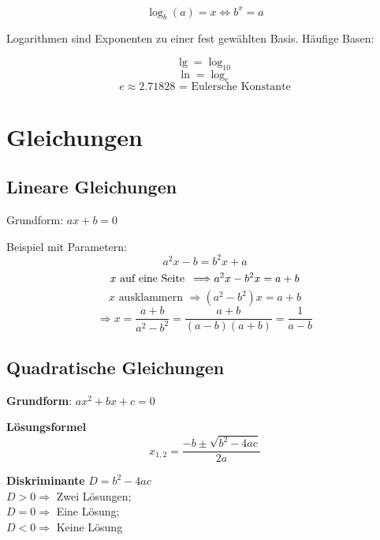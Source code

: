 \begin{multicols}{2}
\begin{tcolorbox}[colback=white]
$$\log_b{}(a)=x \Longleftrightarrow{} b^x = a$$
\end{tcolorbox}

Logarithmen sind Exponenten zu einer fest gewählten Basis. Häufige Basen:

$$\lg = \log_{10} $$
$$\ln = \log_e$$
$$e \approx 2.71828 \textrm{ = Eulersche Konstante}$$


\begin{tcolorbox}[colback=white]

\end{tcolorbox}%
%
\RLP{\forceCB{}}%
\keinHeaderUndKeinFooter{}

\section*{Gleichungen}

\subsection*{Lineare Gleichungen}
Grundform: $ax+b=0$

Beispiel mit Parametern:
$$a^2x-b=b^2x+a$$
$$x\textrm{ auf eine Seite\, } \Longrightarrow a^2x -b^2x = a+b$$
$$x\textrm{ ausklammern }\Longrightarrow (a^2-b^2)x= a+b$$
$$\Longrightarrow x= \frac{a+b}{a^2-b^2} = \frac{a+b}{(a-b)(a+b)}=\frac{1}{a-b}$$

\subsection*{Quadratische Gleichungen}

\textbf{Grundform}: $ax^2 + bx+c = 0$

\begin{tcolorbox}[colback=white]
  \textbf{Lösungsformel}
  $$x_{1,2} = \frac{-b \pm \sqrt{b^2-4ac}}{2a}$$
\end{tcolorbox}
\textbf{Diskriminante} $D = b^2-4ac$\\
$D>0\Longrightarrow$ Zwei Lösungen;\\
$D=0\Longrightarrow$ Eine Lösung;\\
$D<0\Longrightarrow$ Keine Lösung


\end{multicols}
